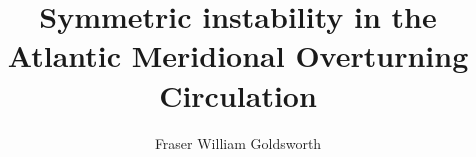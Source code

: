 \documentclass[12pt, rectanglelogo]{ociamthesis}
\title{Symmetric instability in the
        Atlantic Meridional Overturning Circulation}   %
\author{Fraser William Goldsworth}
\begin{document}

\maketitle

\begin{romanpages} 



\tableofcontents
\listoffigures
\end{romanpages}








%
%

\end{document}
